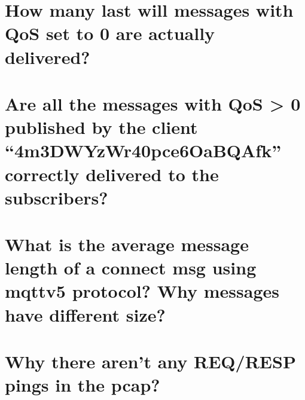 \documentclass{article}
\begin{document}
\section{How many last will messages with QoS set to 0 are
actually delivered?}
\section{Are all the messages with QoS > 0 published by the
client “4m3DWYzWr40pce6OaBQAfk” correctly delivered
to the subscribers?}
\section{What is the average message length of a connect msg
using mqttv5 protocol? Why messages have different
size?}
\section{Why there aren’t any REQ/RESP pings in the pcap?}
\end{document}

